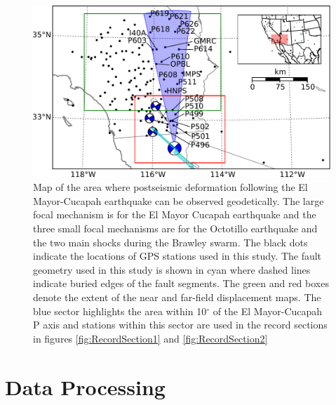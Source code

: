 \documentclass[1p]{elsarticle}
\begin{document}
\begin{figure}
\includegraphics[scale=0.8]{Figures/context_map} 
\caption{Map of the area where postseismic deformation following the El Mayor-Cucapah earthquake can be observed geodetically. The large focal mechanism is for the El Mayor Cucapah earthquake and the three small focal mechanisms are for the Octotillo earthquake and the two main shocks during the Brawley swarm. The black dots indicate the locations of GPS stations used in this study.  The fault geometry used in this study is shown in cyan where dashed lines indicate buried edges of the fault segments.  The green and red boxes denote the extent of the near and far-field displacement maps.  The blue sector highlights the area within 10$^\circ$ of the El Mayor-Cucapah P axis and stations within this sector are used in the record sections in figures \ref{fig:RecordSection1} and \ref{fig:RecordSection2}}       
\label{fig:ContextMap}
\end{figure}

\section{Data Processing}\label{sec:Data}
\end{document}
